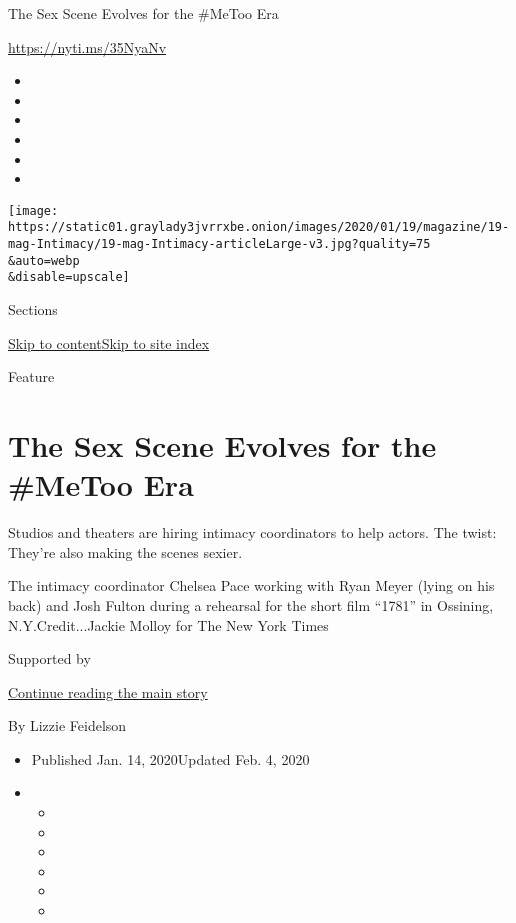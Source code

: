 The Sex Scene Evolves for the \#MeToo Era

\url{https://nyti.ms/35NyaNv}

\begin{itemize}
\item
\item
\item
\item
\item
\item
\end{itemize}

\texttt{[image: https://static01.graylady3jvrrxbe.onion/images/2020/01/19/magazine/19-mag-Intimacy/19-mag-Intimacy-articleLarge-v3.jpg?quality=75\\\&auto=webp\\\&disable=upscale]}

Sections

\protect\hyperlink{site-content}{Skip to
content}\protect\hyperlink{site-index}{Skip to site index}

Feature

\hypertarget{the-sex-scene-evolves-for-the-metoo-era}{%
\section{The Sex Scene Evolves for the \#MeToo
Era}\label{the-sex-scene-evolves-for-the-metoo-era}}

Studios and theaters are hiring intimacy coordinators to help actors.
The twist: They're also making the scenes sexier.

The intimacy coordinator Chelsea Pace working with Ryan Meyer (lying on
his back) and Josh Fulton during a rehearsal for the short film ``1781''
in Ossining, N.Y.Credit...Jackie Molloy for The New York Times

Supported by

\protect\hyperlink{after-sponsor}{Continue reading the main story}

By Lizzie Feidelson

\begin{itemize}
\item
  Published Jan. 14, 2020Updated Feb. 4, 2020
\item
  \begin{itemize}
  \item
  \item
  \item
  \item
  \item
  \item
  \end{itemize}
\end{itemize}

